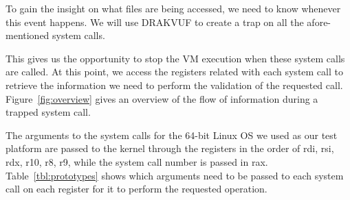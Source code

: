 \par To gain the insight on what files are being accessed, we need to know whenever this event happens. We will use DRAKVUF to create a trap on all the afore-mentioned system calls.

\par This gives us the opportunity to stop the \ac{VM} execution when these system calls are called. At this point, we access the registers related with each system call to retrieve the information we need to perform the validation of the requested call. Figure~\ref{fig:overview} gives an overview of the flow of information during a trapped system call. 

\par The arguments to the system calls for the 64-bit Linux \ac{OS} we used as our test platform are passed to the kernel through the registers in the order of rdi, rsi, rdx, r10, r8, r9, while the system call number is passed in rax. Table~\ref{tbl:prototypes} shows which arguments need to be passed to each system call on each register for it to perform the requested operation.

